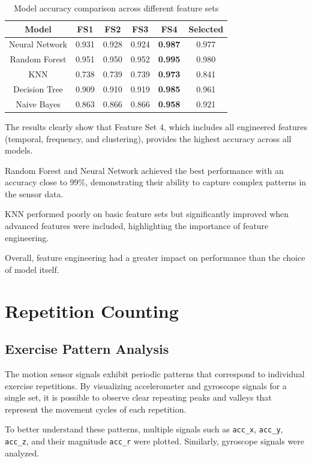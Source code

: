 \documentclass[12pt,a4paper]{article}
\begin{document}
\begin{table}[H]
\centering
\begin{tabular}{cccccc}
\toprule
Model & FS1 & FS2 & FS3 & FS4 & Selected \\
\midrule
Neural Network & 0.931 & 0.928 & 0.924 & \textbf{0.987} & 0.977 \\
Random Forest  & 0.951 & 0.950 & 0.952 & \textbf{0.995} & 0.980 \\
KNN            & 0.738 & 0.739 & 0.739 & \textbf{0.973} & 0.841 \\
Decision Tree  & 0.909 & 0.910 & 0.919 & \textbf{0.985} & 0.961 \\
Naive Bayes    & 0.863 & 0.866 & 0.866 & \textbf{0.958} & 0.921 \\
\bottomrule
\end{tabular}
\caption{Model accuracy comparison across different feature sets}
\end{table}

The results clearly show that Feature Set 4, which includes all engineered features (temporal, frequency, and clustering), provides the highest accuracy across all models. 

Random Forest and Neural Network achieved the best performance with an accuracy close to 99\%, demonstrating their ability to capture complex patterns in the sensor data.

KNN performed poorly on basic feature sets but significantly improved when advanced features were included, highlighting the importance of feature engineering.

Overall, feature engineering had a greater impact on performance than the choice of model itself.
\section{Repetition Counting}

\subsection{Exercise Pattern Analysis}

The motion sensor signals exhibit periodic patterns that correspond to individual exercise repetitions. By visualizing accelerometer and gyroscope signals for a single set, it is possible to observe clear repeating peaks and valleys that represent the movement cycles of each repetition.

To better understand these patterns, multiple signals such as \texttt{acc\_x}, \texttt{acc\_y}, \texttt{acc\_z}, and their magnitude \texttt{acc\_r} were plotted. Similarly, gyroscope signals were analyzed.
\end{document}
